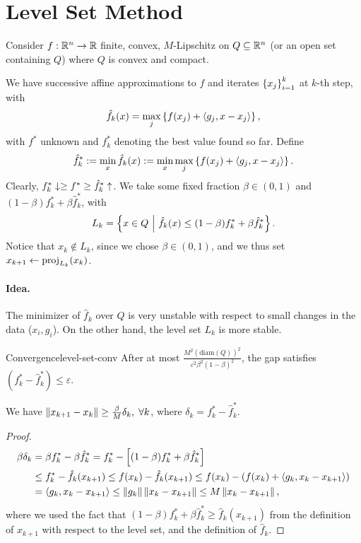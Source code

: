 \section{Level Set Method}
Consider $f: \mathbb{R}^n \to \mathbb{R}$ finite, convex, $M$-Lipschitz on $Q \subseteq
\mathbb{R}^n$ (or an open set containing $Q$) where $Q$ is convex and compact.

We have successive affine approximations to $f$ and iterates
$\left\{ x_j \right\}_{i=1}^k$ at $k$-th step, with
\[
	\hat{f}_k(x) = \max_{j} \left\{ f(x_j) + \left\langle g_j, x - x_j \right\rangle \right\},
\]
with $f^*$ unknown and $f_k^*$ denoting the best value found so far.
Define
\[
	\hat{f}_k^* := \min_{x} \hat{f}_k(x) :=
	\min_{x} \max_{j} \left\{ f(x_j) + \left\langle g_j, x - x_j \right\rangle \right\}.
\]
Clearly, $f_k^* \downarrow \geq f^* \geq \hat{f}_k^* \uparrow$. We take some fixed
fraction $\beta \in (0, 1)$ and $(1 - \beta) f_k^* + \beta \hat{f}_k^*$, with
\[
	L_k = \left\{ x \in Q \ \middle| \  \hat{f}_k(x) \leq (1 - \beta) f_k^* + \beta
	\hat{f}_k^*  \right\}.
\]
Notice that $x_k \notin L_k$, since we chose $\beta \in (0, 1)$,
and we thus set $x_{k+1} \gets \mathrm{proj}_{L_k}(x_k)$.

\paragraph{Idea.} The minimizer of $\hat{f}_k$ over $Q$ is very unstable with
respect to small changes in the data ($x_i, g_i$). On the other hand, the level
set $L_k$ is more stable.

\begin{ctheorem}{Convergence}{level-set-conv}
	After at most $\frac{M^2 (\mathrm{diam}(Q))^2}{\varepsilon^2 \beta^2 (1 -
	\beta)^2}$, the gap satisfies $(f_k^* - \hat{f}_k^*) \leq \varepsilon$.
\end{ctheorem}

\begin{lemma} \label{lemma:A-levelset}
	We have $\left \| x_{k+1} - x_k \right \| \geq \frac{\beta}{M} \delta_k, \; \forall k$,
	where $\delta_k = f_k^* - \hat{f}_k^*$.
\end{lemma}
\begin{proof}
	\begin{align*}
		\beta \delta_k &= \beta f_k^* - \beta \hat{f}_k^* =
			f_k^* - \left[(1 - \beta) f_k^* + \beta \hat{f}_k^* \right] \\
					   &\leq f_k^* - \hat{f}_k (x_{k+1}) \leq
					   	f(x_k) - \hat{f}_k(x_{k+1}) \leq
						f(x_k) - \left(f(x_k) + \left\langle g_k, x_k - x_{k+1} \right\rangle\right)
						\\
			& = \left\langle g_k, x_k - x_{k+1} \right\rangle \leq \left \| g_k \right \| \left \| x_k - x_{k+1} \right \|
			\leq M \left \| x_{k} - x_{k+1} \right \|,
	\end{align*}
	where we used the fact that $(1 - \beta) f_k^* + \beta \hat{f}_k^*
	\geq \hat{f}_k (x_{k+1})$ from the definition of $x_{k+1}$ with respect to
	the level set, and the definition of $\hat{f}_k$.
\end{proof}

